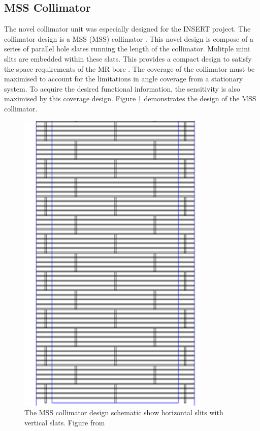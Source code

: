 \subsection{MSS Collimator}
The novel collimator unit was especially designed for the INSERT project. The collimator design is a \acrlong{MSS} (\acrshort{MSS}) collimator \cite{7181734}. This novel design is compose of a series of parallel hole slates running the length of the collimator. Mulitple mini slits are embedded within these slats. This provides a compact design to satisfy the space requirements of the \acrshort{MR} bore \cite{Metzler2010SlitSlatAM}. The coverage of the collimator must be maximised to account for the limitations in angle coverage from a stationary system. To acquire the desired functional information, the sensitivity is also maximised by this coverage design. Figure \ref{fig:MSSColl} demonstrates the design of the MSS collimator.

\begin{figure}[!t]
\centering
\includegraphics[angle=90,origin=c,width=3.6in]{figures/Collimator_Schema.png}

    \caption{The MSS collimator design schematic show horizontal slits with vertical slats. Figure from \cite{8069508}} \label{fig:MSSColl}
\end{figure}


